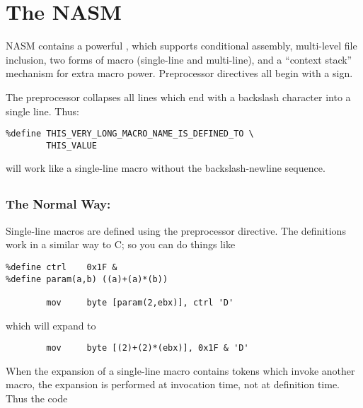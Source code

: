 \chapter{The NASM }
\label{ch:preproc}

NASM contains a powerful , which supports
conditional assembly, multi-level file inclusion, two forms of macro
(single-line and multi-line), and a ``context stack'' mechanism for
extra macro power. Preprocessor directives all begin with a \code{\%}
sign.

The preprocessor collapses all lines which end with a backslash
\code{\textbackslash} character into a single line.
Thus:

\begin{lstlisting}
%define THIS_VERY_LONG_MACRO_NAME_IS_DEFINED_TO \
        THIS_VALUE
\end{lstlisting}

will work like a single-line macro without the backslash-newline
sequence.

\section{}
\label{sec:slmacro}

\subsection{The Normal Way: }
\label{subsec:define}

Single-line macros are defined using the  preprocessor
directive. The definitions work in a similar way to C; so you can do
things like

\begin{lstlisting}
%define ctrl    0x1F &
%define param(a,b) ((a)+(a)*(b))

        mov     byte [param(2,ebx)], ctrl 'D'
\end{lstlisting}

which will expand to

\begin{lstlisting}
        mov     byte [(2)+(2)*(ebx)], 0x1F & 'D'
\end{lstlisting}

When the expansion of a single-line macro contains tokens which
invoke another macro, the expansion is performed at invocation time,
not at definition time. Thus the code

